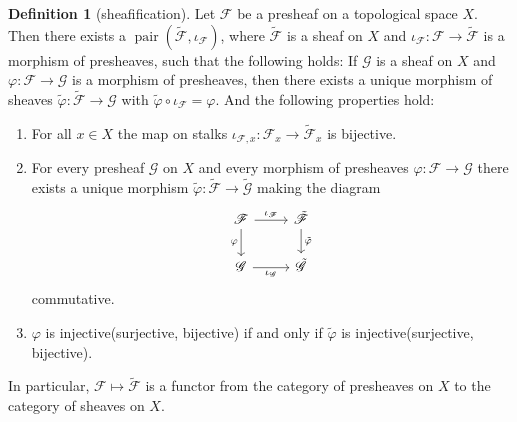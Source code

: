 \documentclass[12pt,a4paper]{book}
\newenvironment{enu}{\begin{enumerate}[(1)]}{\end{enumerate}}
\theoremstyle{definition}
\newtheorem{defn}{Definition}[section]
\begin{document}
\begin{defn}[sheafification]
    Let $\mathscr{F}$ be a presheaf on a topological space $X$. Then there exists a $\operatorname{pair}\left(\tilde{\mathscr{F}}, \iota_{\mathscr{F}}\right)$, where $\tilde{\mathscr{F}}$ is a sheaf on $X$ and $\iota_{\mathscr{F}}: \mathscr{F} \rightarrow \tilde{\mathscr{F}}$ is a morphism of presheaves, such that the following holds: If $\mathscr{G}$ is a sheaf on $X$
    and $\varphi: \mathscr{F} \rightarrow \mathscr{G}$ is a morphism of presheaves, then there exists a unique morphism of sheaves $\tilde{\varphi}: \tilde{\mathscr{F}} \rightarrow \mathscr{G}$ with $\tilde{\varphi} \circ \iota_\mathscr{F}=\varphi$.
    And the following properties hold:
    \begin{enu}
        \item For all $x \in X$ the map on stalks $\iota_{\mathscr{F}, x}: \mathscr{F}_x \rightarrow \tilde{\mathscr{F}}_x$ is bijective.
        \item For every presheaf $\mathscr{G}$ on $X$ and every morphism of presheaves $\varphi: \mathscr{F} \rightarrow \mathscr{G}$ there exists a unique morphism $\tilde{\varphi}: \tilde{\mathscr{F}}\rightarrow \tilde{\mathscr{G}}$ making the diagram
        \[\begin{tikzcd}
                { \mathscr{F}} & {\tilde{\mathscr{F}}} \\
                { \mathscr{G}} & {\tilde{\mathscr{G}}}
                \arrow["{\iota_{\mathscr{F}}}", from=1-1, to=1-2]
                \arrow["\varphi"', from=1-1, to=2-1]
                \arrow["{\iota_{\mathscr{G}}}"', from=2-1, to=2-2]
                \arrow["{\tilde{\varphi}}", from=1-2, to=2-2]
            \end{tikzcd}\]
        commutative.
        \item $\varphi$ is injective(surjective, bijective) if and only if $\tilde{\varphi}$ is injective(surjective, bijective).
    \end{enu}
    In particular, $\mathscr{F} \mapsto \tilde{\mathscr{F}}$ is a functor from the category of presheaves on $X$ to the category of sheaves on $X$.
    \label{proposition:sheafification}
\end{defn}
\end{document}
